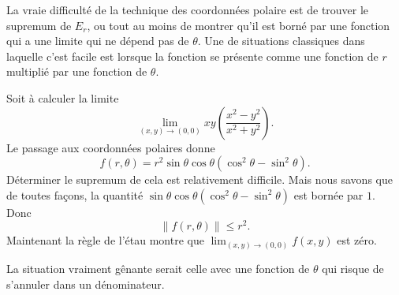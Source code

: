 La vraie difficulté de la technique des coordonnées polaire est de trouver le supremum de $E_r$, ou tout au moins de montrer qu'il est borné par une fonction qui a une limite qui ne dépend pas de $\theta$. Une de situations classiques dans laquelle c'est facile est lorsque la fonction se présente comme une fonction de $r$ multiplié par une fonction de $\theta$. 

\begin{example}		\label{Exemplexyxsqysq}
	Soit à calculer la limite
	\begin{equation}
		\lim_{(x,y)\to(0,0)}xy\left( \frac{ x^2-y^2 }{ x^2+y^2 }\right).
	\end{equation}
	Le passage aux coordonnées polaires donne
	\begin{equation}
		f(r,\theta)=r^2\sin\theta\cos\theta(\cos^2\theta-\sin^2\theta).
	\end{equation}
	Déterminer le supremum de cela est relativement difficile. Mais nous savons que de toutes façons, la quantité $\sin\theta\cos\theta(\cos^2\theta-\sin^2\theta)$ est bornée par $1$. Donc
	\begin{equation}
		\| f(r,\theta) \|\leq r^2.
	\end{equation}
	Maintenant la règle de l'étau montre que $\lim_{(x,y)\to(0,0)}f(x,y)$ est zéro.

	La situation vraiment gênante serait celle avec une fonction de $\theta$ qui risque de s'annuler dans un dénominateur.
\end{example}

